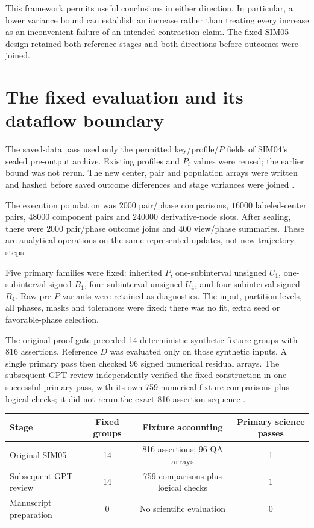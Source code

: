 \documentclass[11pt,a4paper]{article}
\begin{document}
This framework permits useful conclusions in either direction. In particular, a lower variance bound can establish an increase rather than treating every increase as an inconvenient failure of an intended contraction claim. The fixed SIM05 design retained both reference stages and both directions before outcomes were joined.

\clearpage
\section{The fixed evaluation and its dataflow boundary}\label{sec:evaluation}
The saved-data pass used only the permitted key/profile/$P$ fields of SIM04's sealed pre-output archive. Existing profiles and $P_i$ values were reused; the earlier bound was not rerun. The new center, pair and population arrays were written and hashed before saved outcome differences and stage variances were joined \cite{seal}.

The execution population was \ensuremath{2000} pair/phase comparisons, \ensuremath{16000} labeled-center pairs, \ensuremath{48000} component pairs and \ensuremath{240000} derivative-node slots. After sealing, there were \ensuremath{2000} pair/phase outcome joins and \ensuremath{400} view/phase summaries. These are analytical operations on the same represented updates, not new trajectory steps.

Five primary families were fixed: inherited $P$, one-subinterval unsigned $U_1$, one-subinterval signed $B_1$, four-subinterval unsigned $U_4$, and four-subinterval signed $B_4$. Raw pre-$P$ variants were retained as diagnostics. The input, partition levels, all phases, masks and tolerances were fixed; there was no fit, extra seed or favorable-phase selection.

The original proof gate preceded 14 deterministic synthetic fixture groups with 816 assertions. Reference $D$ was evaluated only on those synthetic inputs. A single primary pass then checked 96 signed numerical residual arrays. The subsequent GPT review independently verified the fixed construction in one successful primary pass, with its own 759 numerical fixture comparisons plus logical checks; it did not rerun the exact 816-assertion sequence \cite{review}.

\begin{center}\small\begin{tabular}{lccc}\toprule
Stage & Fixed groups & Fixture accounting & Primary science passes\\\midrule
Original SIM05 & 14 & 816 assertions; 96 QA arrays & 1\\
Subsequent GPT review & 14 & 759 comparisons plus logical checks & 1\\
Manuscript preparation & 0 & No scientific evaluation & 0\\\bottomrule
\end{tabular}\end{center}
\end{document}
